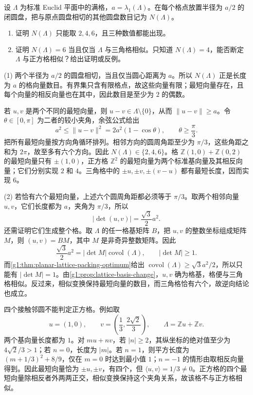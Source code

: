 \begin{exercise}
	\label{g1:ex:planar-lattice-contact-count}
	设 \(\Lambda\) 为标准 Euclid 平面中的满格，\(a=\lambda_1(\Lambda)\)。在每个格点放置半径为 \(a/2\) 的闭圆盘，把与原点圆盘相切的其他圆盘数目记为 \(N(\Lambda)\)。
	\begin{enumerate}
		\item 证明 \(N(\Lambda)\) 只能取 \(2,4,6\)，且三种数值都能出现。
		\item 证明 \(N(\Lambda)=6\) 当且仅当 \(\Lambda\) 与三角格相似。只知道 \(N(\Lambda)=4\)，能否断定 \(\Lambda\) 与正方格相似？给出证明或反例。
	\end{enumerate}
\end{exercise}
\begin{solution}
	(1) 两个半径为 \(a/2\) 的圆盘相切，当且仅当圆心距离为 \(a\)。所以 \(N(\Lambda)\) 正是长度为 \(a\) 的格向量数目。有界集只含有限格点，故这些向量有限；最短向量存在，且每个向量的相反向量也在其中，因此数目是至少为 \(2\) 的偶数。

	若 \(u,v\) 是两个不同的最短向量，则 \(u-v\in\Lambda\setminus\{0\}\)，从而 \(\lVert u-v\rVert\ge a\)。令 \(\theta\in[0,\pi]\) 为二者的较小夹角，余弦公式给出
	\[
		a^2\le\lVert u-v\rVert^2=2a^2(1-\cos\theta),\qquad
		\theta\ge\frac\pi3.
	\]
	把所有最短向量按方向角循环排列。相邻方向的圆周角距至少为 \(\pi/3\)，这些角距之和为 \(2\pi\)，故至多有六个方向。因此 \(N(\Lambda)\in\{2,4,6\}\)。格 \(\mathbb Z(1,0)+\mathbb Z(0,2)\) 的最短向量只有 \(\pm(1,0)\)，正方格 \(\mathbb Z^2\) 的最短向量为两个标准基向量及其相反向量；它们分别实现 \(2\) 和 \(4\)。三角格中的 \(\pm u,\pm v,\pm(v-u)\) 都有最短长度，因而实现 \(6\)。

	(2) 若恰有六个最短向量，上述六个圆周角距都必须等于 \(\pi/3\)。取两个相邻向量 \(u,v\)，它们长度都为 \(a\)，夹角为 \(\pi/3\)，所以
	\[
		|\det(u,v)|=\frac{\sqrt3}{2}a^2.
	\]
	还需证明它们生成整个格。取 \(\Lambda\) 的任一格基矩阵 \(B\)，把 \(u,v\) 的整数坐标组成矩阵 \(M\)，则 \((u,v)=BM\)，其中 \(M\) 是非奇异整数矩阵。因此
	\[
		\frac{\sqrt3}{2}a^2=|\det M|\operatorname{covol}(\Lambda),\qquad
		|\det M|\ge1.
	\]
	而\cref{g1:thm:planar-lattice-packing-optimum}给出 \(\operatorname{covol}(\Lambda)\ge\sqrt3a^2/2\)，所以只能有 \(|\det M|=1\)。由\cref{g1:prop:lattice-basis-change}，\(u,v\) 确为格基，格便与三角格相似。反过来，相似变换保持最短向量的数目，而三角格恰有六个，故逆向结论也成立。

	四个接触邻圆不能判定正方格。例如取
	\[
		u=(1,0),\qquad v=\left(\frac13,\frac{2\sqrt2}{3}\right),\qquad
		\Lambda=\mathbb Zu+\mathbb Zv.
	\]
	两个基向量长度都为 \(1\)。对 \(mu+nv\)，若 \(|n|\ge2\)，其纵坐标的绝对值至少为 \(4\sqrt2/3>1\)；若 \(n=0\)，长度为 \(|m|\)。若 \(n=1\)，则平方长度为 \((m+1/3)^2+8/9\)，仅在 \(m=0\) 时达到最小值 \(1\)；\(n=-1\) 的情形由取相反向量得到。因此最短向量恰为 \(\pm u,\pm v\)，有四个，但 \(\langle u,v\rangle=1/3\ne0\)。正方格的四个最短向量除相反者外两两正交，相似变换保持这个夹角关系，故该格不与正方格相似。
\end{solution}


